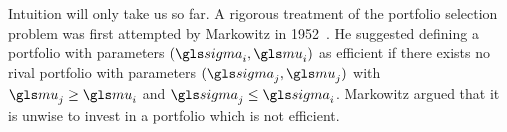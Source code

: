 Intuition will only take us so far. A rigorous treatment of the portfolio selection problem was first attempted by Markowitz in 1952~\cite{Markowitz1952}. He suggested defining a portfolio with parameters $(\gsigma_i, \gmu_i)$ as efficient if there exists no rival portfolio with parameters $(\gsigma_j, \gmu_j)$ with $\gmu_j\geq\gmu_i$ and $\gsigma_j\leq\gsigma_i$.
Markowitz argued that it is unwise to invest in a portfolio which is not efficient.

